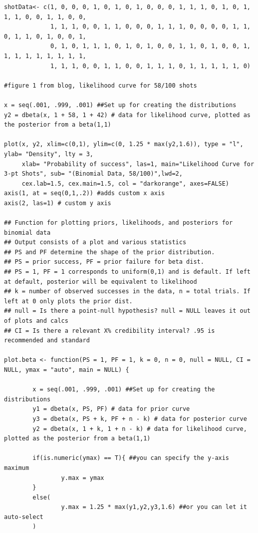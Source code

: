\begin{lstlisting}
shotData<- c(1, 0, 0, 0, 1, 0, 1, 0, 1, 0, 0, 0, 1, 1, 1, 0, 1, 0, 1, 1, 1, 0, 0, 1, 1, 0, 0,
             1, 1, 1, 0, 0, 1, 1, 0, 0, 0, 1, 1, 1, 0, 0, 0, 0, 1, 1, 0, 1, 1, 0, 1, 0, 0, 1,
             0, 1, 0, 1, 1, 1, 0, 1, 0, 1, 0, 0, 1, 1, 0, 1, 0, 0, 1, 1, 1, 1, 1, 1, 1, 1, 1,
             1, 1, 1, 0, 0, 1, 1, 0, 0, 1, 1, 1, 0, 1, 1, 1, 1, 1, 0)

#figure 1 from blog, likelihood curve for 58/100 shots

x = seq(.001, .999, .001) ##Set up for creating the distributions
y2 = dbeta(x, 1 + 58, 1 + 42) # data for likelihood curve, plotted as the posterior from a beta(1,1)

plot(x, y2, xlim=c(0,1), ylim=c(0, 1.25 * max(y2,1.6)), type = "l", ylab= "Density", lty = 3,
     xlab= "Probability of success", las=1, main="Likelihood Curve for 3-pt Shots", sub= "(Binomial Data, 58/100)",lwd=2,
     cex.lab=1.5, cex.main=1.5, col = "darkorange", axes=FALSE)
axis(1, at = seq(0,1,.2)) #adds custom x axis
axis(2, las=1) # custom y axis

## Function for plotting priors, likelihoods, and posteriors for binomial data
## Output consists of a plot and various statistics
## PS and PF determine the shape of the prior distribution.
## PS = prior success, PF = prior failure for beta dist. 
## PS = 1, PF = 1 corresponds to uniform(0,1) and is default. If left at default, posterior will be equivalent to likelihood
## k = number of observed successes in the data, n = total trials. If left at 0 only plots the prior dist.
## null = Is there a point-null hypothesis? null = NULL leaves it out of plots and calcs
## CI = Is there a relevant X% credibility interval? .95 is recommended and standard

plot.beta <- function(PS = 1, PF = 1, k = 0, n = 0, null = NULL, CI = NULL, ymax = "auto", main = NULL) {
        
        x = seq(.001, .999, .001) ##Set up for creating the distributions
        y1 = dbeta(x, PS, PF) # data for prior curve
        y3 = dbeta(x, PS + k, PF + n - k) # data for posterior curve
        y2 = dbeta(x, 1 + k, 1 + n - k) # data for likelihood curve, plotted as the posterior from a beta(1,1)
        
        if(is.numeric(ymax) == T){ ##you can specify the y-axis maximum
                y.max = ymax
        }        
        else(
                y.max = 1.25 * max(y1,y2,y3,1.6) ##or you can let it auto-select
        )
        

\end{lstlisting}

